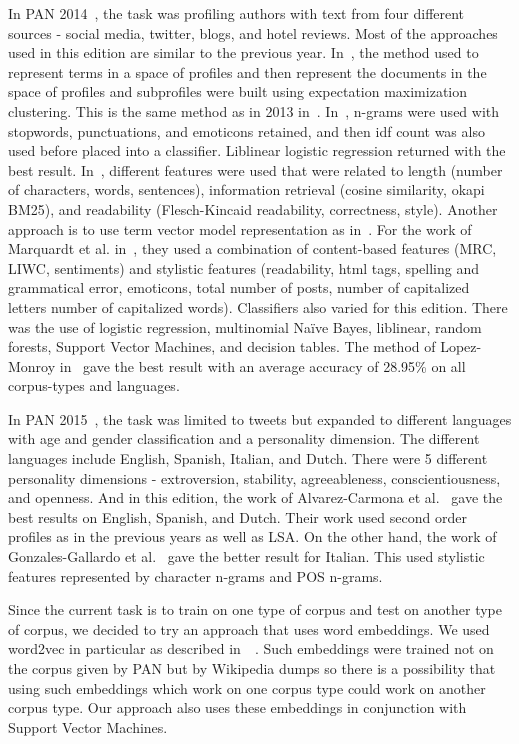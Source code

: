 \documentclass[conference]{IEEEtran}
\begin{document}
In PAN 2014~\cite{rangel2014overview}, the task was profiling authors with text from four different sources - social media, twitter, blogs, and hotel reviews. Most of the approaches used in this edition are similar to the previous year. In~\cite{lopezusing}, the method used to represent terms in a space of profiles and then represent the documents in the space of profiles and subprofiles were built using expectation maximization clustering. This is the same method as in 2013 in~\cite{lopez2013inaoe}. In~\cite{maharjansimple}, n-grams were used with stopwords, punctuations, and emoticons retained, and then idf count was also used before placed into a classifier. Liblinear logistic regression returned with the best result. In~\cite{weren6exploring}, different features were used that were related to length (number of characters, words, sentences), information retrieval (cosine similarity, okapi BM25), and readability (Flesch-Kincaid readability, correctness, style). Another approach is to use term vector model representation as in~\cite{villenadaedalus}. For the work of Marquardt et al. in~\cite{marquardt2014age}, they used a combination of content-based features (MRC, LIWC, sentiments) and stylistic features (readability, html tags, spelling and grammatical error, emoticons, total number of posts, number of capitalized letters number of capitalized words). Classifiers also varied for this edition. There was the use of logistic regression, multinomial Naïve Bayes, liblinear, random forests, Support Vector Machines, and decision tables. The method of Lopez-Monroy in~\cite{lopezusing} gave the best result with an average accuracy of 28.95\% on all corpus-types and languages.

In PAN 2015~\cite{rangel2015overview}, the task was limited to tweets but expanded to different languages with age and gender classification and a personality dimension. The different languages include English, Spanish, Italian, and Dutch. There were 5 different personality dimensions - extroversion, stability, agreeableness, conscientiousness, and openness. And in this edition, the work of Alvarez-Carmona et al.~\cite{alvarezinaoe} gave the best results on English, Spanish, and Dutch. Their work used second order profiles as in the previous years as well as LSA. On the other hand, the work of Gonzales-Gallardo et al.~\cite{gonzaleztweets} gave the better result for Italian. This used stylistic features represented by character n-grams and POS n-grams.

Since the current task is to train on one type of corpus and test on another type of corpus, we decided to try an approach that uses word embeddings. We used word2vec in particular as described in~\cite{mikolov2013efficient}~\cite{mikolov2013distributed}. Such embeddings were trained not on the corpus given by PAN but by Wikipedia dumps so there is a possibility that using such embeddings which work on one corpus type could work on another corpus type. Our approach also uses these embeddings in conjunction with Support Vector Machines.
\end{document}
